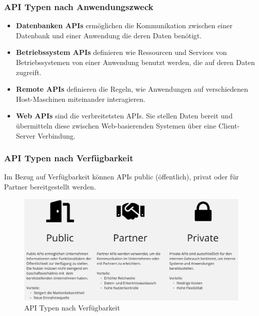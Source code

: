 \subsubsection{API Typen nach Anwendungszweck} %
\label{sec:apitypenanwendungszweck}
\begin{itemize}
\item \textbf{Datenbanken APIs} ermöglichen die Kommunikation zwischen einer Datenbank und einer Anwendung die deren Daten benötigt. \citep{TUM}

\item \textbf{Betriebssystem APIs} definieren wie Ressourcen und Services von Betriebssystemen von einer Anwendung benutzt werden, die auf deren Daten zugreift. \citep{TUM}

\item \textbf{Remote APIs} definieren die Regeln, wie Anwendungen auf verschiedenen Host-Maschinen miteinander interagieren. \citep{TUM}

\item \textbf{Web APIs} sind die verbreitetsten APIs. Sie stellen Daten bereit und übermitteln diese zwischen Web-basierenden Systemen über eine Client-Server Verbindung. \citep{TUM}

\end{itemize}

\subsubsection{API Typen nach Verfügbarkeit} %
\label{sec:apitypenverfuegbarkeit}
Im Bezug auf Verfügbarkeit können APIs public (öffentlich), privat oder für Partner bereitgestellt werden. 
\begin{figure}[h!]
	\centering
	\includegraphics[scale=0.3]{Illustrations/apitypes.jpg}
	\caption{API Typen nach Verfügbarkeit}
\end{figure}


